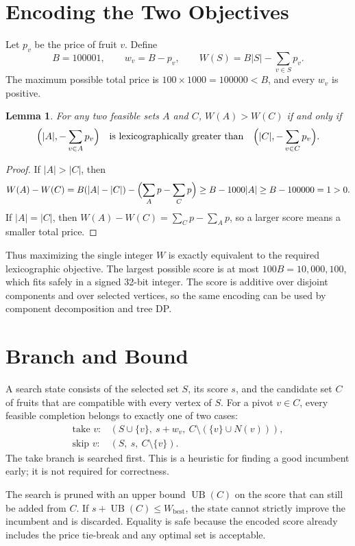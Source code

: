 \documentclass[12pt,a4paper]{report}
\newtheorem{lemma}{Lemma}
\begin{document}
\section{Encoding the Two Objectives}

Let $p_v$ be the price of fruit $v$.  Define
\[
B=100001,\qquad w_v=B-p_v,\qquad W(S)=B|S|-\sum_{v\in S}p_v .
\]
The maximum possible total price is $100\times1000=100000<B$, and every
$w_v$ is positive.

\begin{lemma}
For any two feasible sets $A$ and $C$, $W(A)>W(C)$ if and only if
\[
\Bigl(|A|,-\sum_{v\in A}p_v\Bigr)
\quad\text{is lexicographically greater than}\quad
\Bigl(|C|,-\sum_{v\in C}p_v\Bigr).
\]
\end{lemma}

\begin{proof}
If $|A|>|C|$, then
\[
W(A)-W(C)=B(|A|-|C|)-\Bigl(\sum_{A}p-\sum_{C}p\Bigr)
\ge B-1000|A|\ge B-100000=1>0 .
\]
If $|A|=|C|$, then $W(A)-W(C)=\sum_{C}p-\sum_{A}p$, so a larger score means a
smaller total price.
\end{proof}

Thus maximizing the single integer $W$ is exactly equivalent to the required
lexicographic objective.  The largest possible score is at most
$100B=10{,}000{,}100$, which fits safely in a signed 32-bit integer.  The score
is additive over disjoint components and over selected vertices, so the same
encoding can be used by component decomposition and tree DP.

\section{Branch and Bound}

A search state consists of the selected set $S$, its score $s$, and the
candidate set $C$ of fruits that are compatible with every vertex of $S$.
For a pivot $v\in C$, every feasible completion belongs to exactly one of two
cases:
\[
\begin{array}{ll}
\text{take }v:& (S\cup\{v\},\ s+w_v,\ C\setminus(\{v\}\cup N(v))),\\
\text{skip }v:& (S,\ s,\ C\setminus\{v\}).
\end{array}
\]
The take branch is searched first.  This is a heuristic for finding a good
incumbent early; it is not required for correctness.

The search is pruned with an upper bound $\operatorname{UB}(C)$ on the score
that can still be added from $C$.  If $s+\operatorname{UB}(C)\le W_{\text{best}}$,
the state cannot strictly improve the incumbent and is discarded.  Equality is
safe because the encoded score already includes the price tie-break and any
optimal set is acceptable.
\end{document}
